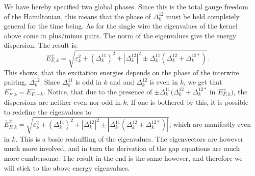 We have hereby specified two global phases. Since this is the total gauge freedom of the Hamiltonian, this means that the phase of $\Delta^{12}_k$ must be held completely general for the time being. As for the single wire the eigenvalues of the kernel above come in plus/minus pairs. The norm of the eigenvalues give the energy dispersion. The result is:
\begin{equation}
E^{\pm}_{F,k} = \sqrt{\varepsilon^2_k + \left(\Delta^{11}_k\right)^2 + \left|\Delta^{12}_k\right|^2 \pm \Delta^{11}_k(\Delta^{12}_k + \Delta^{12*}_k)}. 
\end{equation} 
This shows, that the excitation energies depends on the phase of the interwire pairing, $\Delta^{12}_k$. Since $\Delta^{11}_k$ is odd in $k$ and and $\Delta^{12}_k$ is even in $k$, we get that $E^{+}_{F,k} = E^{-}_{F,-k}$. Notice, that due to the presence of $\pm \Delta^{11}_k(\Delta^{12}_k + \Delta^{12*}_k$ in $E^{\pm}_{F,k})$, the dispersions are neither even nor odd in $k$. If one is bothered by this, it is possible to redefine the eigenvalues to $\bar{E}^{\pm}_{F,k} = \sqrt{\varepsilon^2_k + \left(\Delta^{11}_k\right)^2 + \left|\Delta^{12}_k\right|^2 \pm |\Delta^{11}_k(\Delta^{12}_k + \Delta^{12*}_k)|}$, which are manifestly even in $k$. This is a basic reshuffling of the eigenvalues. The eigenvectors are however much more involved, and in turn the derivation of the gap equations are much more cumbersome. The result in the end is the same however, and therefore we will stick to the above energy eigenvalues.  

